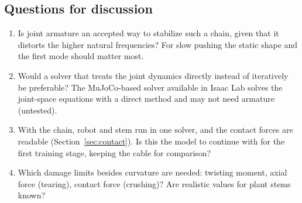 \documentclass[11pt,a4paper]{article}
\begin{document}
\subsection{Questions for discussion}

\begin{enumerate}
  \item Is joint armature an accepted way to stabilize such a chain, given that it distorts the higher natural
        frequencies? For slow pushing the static shape and the first mode should matter most.
  \item Would a solver that treats the joint dynamics directly instead of iteratively be preferable? The
        MuJoCo-based solver available in Isaac Lab solves the joint-space equations with a direct method and
        may not need armature (untested).
  \item With the chain, robot and stem run in one solver, and the contact forces are readable
        (Section~\ref{sec:contact}). Is this the model to continue with for the first training stage, keeping
        the cable for comparison?
  \item Which damage limits besides curvature are needed: twisting moment, axial force (tearing), contact force
        (crushing)? Are realistic values for plant stems known?
\end{enumerate}
\end{document}
